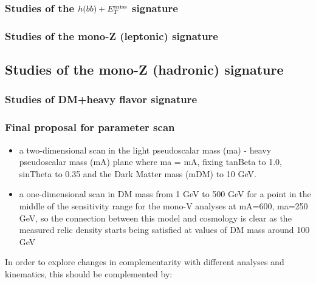 \subsubsection{Studies of the $h(bb)+E_T^\mathrm{miss}$ signature}


\FloatBarrier
\subsubsection{Studies of the mono-Z (leptonic) signature}

\FloatBarrier
\subsection{Studies of the mono-Z (hadronic) signature}


\subsubsection{Studies of DM+heavy flavor signature}



\subsubsection{Final proposal for parameter scan}

\begin{itemize}

\item a two-dimensional scan in the light pseudoscalar mass (ma) -
heavy pseudoscalar mass (mA) plane where ma = mA, fixing tanBeta to 1.0,
sinTheta to 0.35 and the Dark Matter mass (mDM) to 10 GeV.


\item a one-dimensional scan in DM mass from 1 GeV to 500 GeV for a
point in the middle of the sensitivity range for the mono-V analyses at
mA=600, ma=250 GeV, so the connection between this model and cosmology
is clear as the measured relic density starts being satisfied at values
of DM mass around 100 GeV

\end{itemize}


In order to explore changes in complementarity with different
analyses and kinematics, this should be complemented by:

